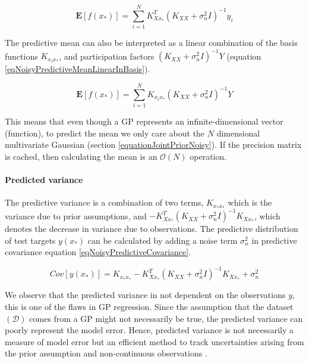   \begin{equation}\label{eqNoisyPredictiveMeanLinearInY}
  \mathbf{E}[f(x_{*})] = \sum_{i = 1}^{N} K_{Xx_{*}}^{T}( K_{XX} + \sigma^{2}_{n}I)^{-1}y_{i}
  \end{equation}

The predictive mean can also be interpreted as a linear combination of the basis functions $K_{x_{i}x_{*}}$, and participation factors $( K_{XX} + \sigma^{2}_{n}I)^{-1}Y$ (equation \ref{eqNoisyPredictiveMeanLinearInBasis}). 

  \begin{equation}\label{eqNoisyPredictiveMeanLinearInBasis}
  \mathbf{E}[f(x_{*})] = \sum_{i = 1}^{N} K_{x_{i}x_{*}}( K_{XX} + \sigma^{2}_{n}I)^{-1}Y
  \end{equation}
  
This means that even though a GP represents an infinite-dimensional vector (function), to predict the mean we only care about the $N$ dimensional multivariate Gaussian (section \ref{equationJointPriorNoisy}). If the precision matrix is cached, then calculating the mean is an $\mathcal{O}\left ( N \right )$ operation.

\paragraph{Predicted variance}
The predictive variance is a combination of two terms, $K_{x_{*}x_{*}}$ which is the variance due to prior assumptions, and $- K_{Xx_{*}}^{T}( K_{XX} + \sigma^{2}_{n}I )^{-1} K_{Xx_{*}}$, which denotes the decrease in variance due to observations. The predictive distribution of test targets $y(x_{*})$ can be calculated by adding a noise term $\sigma^{2}_{n}$ in predictive covariance equation \ref{eqNoisyPredictiveCovariance}. 

  \begin{equation}\label{eqNoisyPredictiveCovarianceOnNoisyTarget}
	Cov[y(x_{*})] = K_{x_{*}x_{*}} - K_{Xx_{*}}^{T}( K_{XX} + \sigma^{2}_{n}I )^{-1} K_{Xx_{*}} + \sigma_{n}^{2}
  \end{equation}
  
We observe that the predicted variance in not dependent on the observations $y$, this is one of the flaws in GP regression. Since the assumption that the dataset $(\mathcal{D})$ comes from a GP might not necessarily be true, the predicted variance can poorly represent the model error. Hence, predicted variance is not necessarily a measure of model error but an efficient method to track uncertainties arising from the prior assumption and non-continuous observations \cite{shah2014student}.

